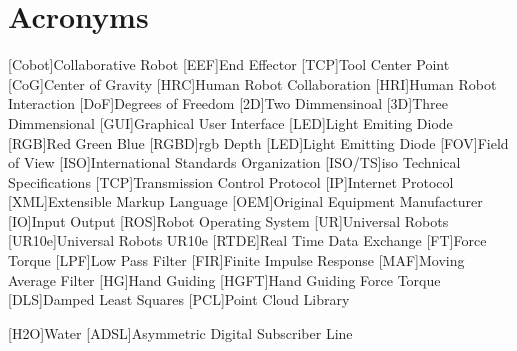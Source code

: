 \chapter{Acronyms}

\footnotesize
\SingleSpacing

\begin{multicols}{2}
\begin{acronym}[AAAAAA]

    [Cobot]{Collaborative Robot}
    [EEF]{End Effector}
    [TCP]{Tool Center Point}
    [CoG]{Center of Gravity}
    [HRC]{Human Robot Collaboration}
    [HRI]{Human Robot Interaction}
    [DoF]{Degrees of Freedom}
    [2D]{Two Dimmensinoal}
    [3D]{Three Dimmensional}
    [GUI]{Graphical User Interface}
    [LED]{Light Emiting Diode}
    [RGB]{Red Green Blue}
    [RGBD]{\acs{rgb} Depth}
    [LED]{Light Emitting Diode}
    [FOV]{Field of View}
    [ISO]{International Standards Organization}
    [ISO/TS]{\acs{iso} Technical Specifications}
    [TCP]{Transmission Control Protocol}
    [IP]{Internet Protocol}
    [XML]{Extensible Markup Language}
    [OEM]{Original Equipment Manufacturer}
    [IO]{Input Output}
    [ROS]{Robot Operating System}
    [UR]{Universal Robots}
    [UR10e]{Universal Robots UR10e}
    [RTDE]{Real Time Data Exchange}
    [FT]{Force Torque}
    [LPF]{Low Pass Filter}
    [FIR]{Finite Impulse Response}
    [MAF]{Moving Average Filter}
    [HG]{Hand Guiding}
    [HGFT]{Hand Guiding Force Torque}
    [DLS]{Damped Least Squares}
    [PCL]{Point Cloud Library}

	[H2O]{Water}
	[ADSL]{Asymmetric Digital Subscriber Line}

\end{acronym}
\end{multicols}

